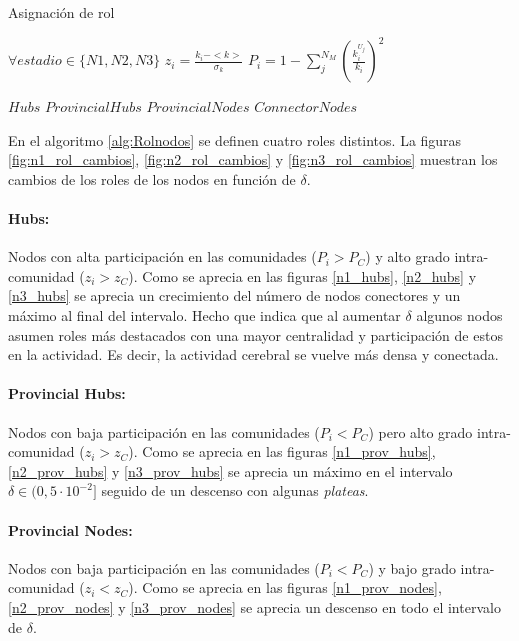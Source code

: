 \documentclass{article}
\begin{document}
\begin{algorithm}[H]
\caption[]{Asignación de rol\footnotemark}
\label{alg:Rolnodos}
\begin{algorithmic}
\State $\forall estadio \in \{N1, N2, N3\}$
\State $z_i= \frac{k_i-<k>}{\sigma_k}$
\State $P_i= 1- \sum_{j}^{N_{M}} \left( \frac{k_i^{U_j}}{k_i} \right)^2$

    \State $Hubs$
\Else {}
    \State $Provincial Hubs$
\Else {}
    \State $Provincial Nodes$
\Else {}
    \State $Connector Nodes$
\EndIf
\EndIf
\EndIf
\EndIf
\end{algorithmic}
\end{algorithm}

En el algoritmo \ref{alg:Rolnodos} se definen cuatro roles distintos. La figuras \ref{fig:n1_rol_cambios}, \ref{fig:n2_rol_cambios} y \ref{fig:n3_rol_cambios} muestran los cambios de los roles de los nodos en función de $\delta$.

\paragraph{Hubs:} Nodos con alta participación en las comunidades ($P_i > P_C$) y alto grado intra-comunidad ($z_i > z_C$). Como se aprecia en las figuras \ref{n1_hubs}, \ref{n2_hubs} y \ref{n3_hubs} se aprecia un crecimiento del número de nodos conectores y un máximo al final del intervalo. Hecho que indica que al aumentar $\delta$ algunos nodos asumen roles más destacados con una mayor centralidad y participación de estos en la actividad. Es decir, la actividad cerebral se vuelve más densa y conectada.

\paragraph{Provincial Hubs:} Nodos con baja participación en las comunidades ($P_i < P_C$) pero alto grado intra-comunidad ($z_i > z_C$). Como se aprecia en las figuras \ref{n1_prov_hubs}, \ref{n2_prov_hubs} y \ref{n3_prov_hubs} se aprecia un máximo en el intervalo $\delta \in (0,5\cdot10^{-2}]$ seguido de un descenso con algunas \textit{plateas}.

\paragraph{Provincial Nodes:} Nodos con baja participación en las comunidades ($P_i < P_C$) y bajo grado intra-comunidad ($z_i < z_C$). Como se aprecia en las figuras \ref{n1_prov_nodes}, \ref{n2_prov_nodes} y \ref{n3_prov_nodes} se aprecia un descenso en todo el intervalo de $\delta$.
\end{document}
